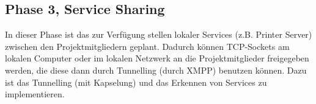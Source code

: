 \subsection{Phase 3, Service Sharing}
In dieser Phase ist das zur Verfügung stellen lokaler Services (z.B. Printer Server) zwischen den 
Projektmitgliedern geplant. Dadurch können TCP-Sockets am lokalen Computer oder im lokalen Netzwerk 
an die Projektmitglieder freigegeben werden, die diese dann durch Tunnelling (durch XMPP) benutzen
können. Dazu ist das Tunnelling (mit Kapselung) und das Erkennen von Services zu implementieren.


